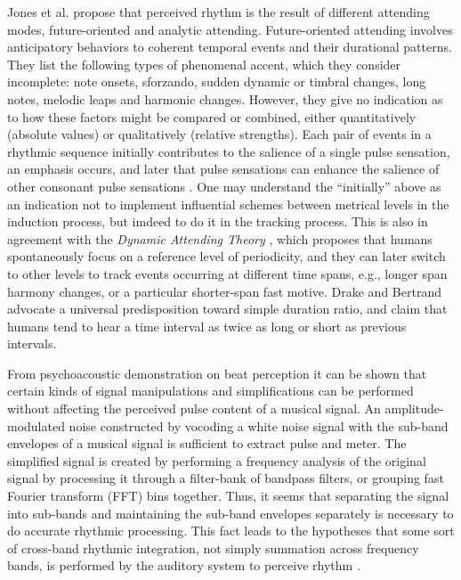 \documentclass{scrartcl}
\begin{document}
Jones et al. \cite{Jones1989} propose that perceived rhythm is the result of different attending modes, future-oriented and analytic attending. Future-oriented attending involves anticipatory behaviors to coherent temporal events and their durational patterns. They list the following types of phenomenal accent, which they consider incomplete: note onsets, sforzando, sudden dynamic or timbral changes, long notes, melodic leaps and harmonic changes. However, they give no indication as to how these factors might be compared or combined, either quantitatively (absolute values) or qualitatively (relative strengths). Each pair of events in a rhythmic sequence initially contributes to the salience of a single pulse sensation, an emphasis occurs, and later that pulse sensations can enhance the salience of other consonant pulse sensations \cite{Parncutt1994}. One may understand the ``initially'' above as an indication not to implement influential schemes between metrical levels in the induction process, but imdeed to do it in the tracking process. This is also in agreement with the \emph{Dynamic Attending Theory} \cite{Jones1989}, which proposes that humans spontaneously focus on a reference level of periodicity, and they can later switch to other levels to track events occurring at different time spans, e.g., longer span harmony changes, or a particular shorter-span fast motive. Drake and Bertrand \cite{Drake2001} advocate a universal predisposition toward simple duration ratio, and claim that humans tend to hear a time interval as twice as long or short as previous intervals. 

From psychoacoustic demonstration on beat perception it can be shown that certain kinds of signal manipulations and simplifications can be performed without affecting the perceived pulse content of a musical signal. An amplitude-modulated noise constructed by vocoding a white noise signal with the sub-band envelopes of a musical signal is sufficient to extract pulse and meter. The simplified signal is created by performing a frequency analysis of the original signal by processing it through a filter-bank of bandpass filters, or grouping fast Fourier transform (FFT) bins together. Thus, it seems that separating the signal into sub-bands and maintaining the sub-band envelopes separately is necessary to do accurate rhythmic processing. This fact leads to the hypotheses that some sort of cross-band rhythmic integration, not simply summation across frequency bands, is performed by the auditory system to perceive rhythm \cite{Scheirer1998}.
\end{document}
